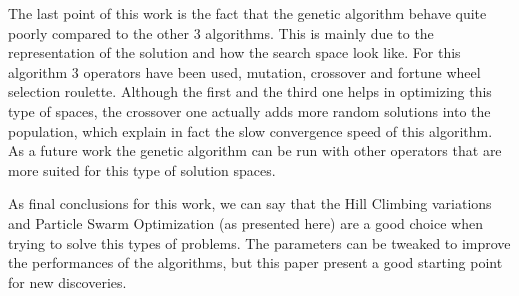 The last point of this work is the fact that the genetic algorithm behave quite poorly compared to the other 3 algorithms. This is mainly due to the representation of the solution and how the search space look like. For this algorithm 3 operators have been used, mutation, crossover and fortune wheel selection roulette. Although the first and the third one helps in optimizing this type of spaces, the crossover one actually adds more random solutions into the population, which explain in fact the slow convergence speed of this algorithm. As a future work the genetic algorithm can be run with other operators that are more suited for this type of solution spaces.

As final conclusions for this work, we can say that the Hill Climbing variations and Particle Swarm Optimization (as presented here) are a good choice when trying to solve this types of problems. The parameters can be tweaked to improve the performances of the algorithms, but this paper present a good starting point for new discoveries.